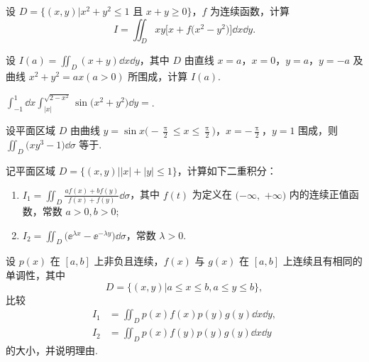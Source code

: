 	\begin{ti}
		设 $D = \bigl\{ (x,y) \bigl| x^{2} + y^{2} \leq 1 \text{\ 且\ } x + y \geq 0 \bigr\}$，$f$ 为连续函数，计算
		\[
			I = \iint_{D} xy \bigl[ x + f\bigl( x^{2} - y^{2} \bigr) \bigr] \dd{x} \dd{y}.
		\]
	\end{ti}

	\begin{ti}
		设 $I(a) = \iint_{D} (x + y) \dd{x} \dd{y}$，其中 $D$ 由直线 $x = a$，$x = 0$，$y = a$，$y = -a$ 及曲线 $x^{2} + y^{2} = ax(a > 0)$ 所围成，计算 $I(a)$.
	\end{ti}

	\begin{ti}
		$\int_{-1}^{1} \dd{x} \int_{|x|}^{\sqrt{2 - x^{2}}} \sin \bigl( x^{2} + y^{2} \bigr) \dd{y} = $\kuo.

	\end{ti}

	\begin{ti}
		设平面区域 $D$ 由曲线 $y = \sin x \bigl( - \frac{\uppi}{2} \leq x \leq \frac{\uppi}{2} \bigr)$，$x = -\frac{\uppi}{2}$，$y = 1$ 围成，则 $\iint_{D} \bigl( xy^{3} - 1 \bigr) \dd{\sigma}$ 等于\kuo.

		\fourch{$2$}{$-2$}{$\uppi$}{$-\uppi$}
	\end{ti}

	\begin{ti}
		记平面区域 $D = \bigl\{ (x,y) \bigl| |x| + |y| \leq 1 \bigr\}$，计算如下二重积分：
		\begin{enumerate}
			\item $I_{1} = \iint_{D} \frac{af(x) + bf(y)}{f(x) + f(y)} \dd{\sigma}$，其中 $f(t)$ 为定义在 $(-\infty,$ $+\infty)$ 内的连续正值函数，常数 $a > 0, b > 0$;
			\item $I_{2} = \iint_{D} \bigl( \ee^{\lambda x} - \ee^{-\lambda y} \bigr) \dd{\sigma}$，常数 $\lambda > 0$.
		\end{enumerate}
	\end{ti}

	\begin{ti}
		设 $p(x)$ 在 $[a,b]$ 上非负且连续，$f(x)$ 与 $g(x)$ 在 $[a,b]$ 上连续且有相同的单调性，其中
		\[
			D = \bigl\{ (x,y) \bigl| a \leq x \leq b, a \leq y \leq b \bigr\},
		\]
		比较
		\begin{align*}
			I_{1} &= \iint_{D} p(x) f(x) p(y) g(y) \dd{x} \dd{y},\\
			I_{2} &= \iint_{D} p(x) f(y) p(y) g(y) \dd{x} \dd{y}
		\end{align*}
		的大小，并说明理由.
	\end{ti}